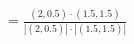 \documentclass[preview]{standalone}
\begin{document}
\begin{align*}
&= \frac{(2, 0.5) \cdot (1.5, 1.5)}{|(2, 0.5)| \cdot |(1.5, 1.5)|}\\
\end{align*}
\end{document}
